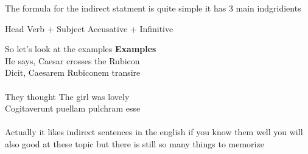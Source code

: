 The formula for the indirect statment is quite simple it has
3 main indgridients 
\begin{center}
  Head Verb + Subject Accusative + Infinitive 
\end{center}
So let's look at the examples
\newpage
{\textbf{\Large Examples}} \\
He says, Caesar crosses the Rubicon \\ 
Dicit, Caesarem Rubiconem transire \\ \\
They thought The girl was lovely \\ 
Cogitaverunt puellam pulchram esse \\\\
Actually it likes indirect sentences in the english if you
know them well you will also good at these topic but there
is still so many things to memorize

